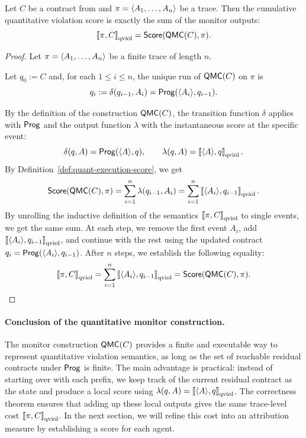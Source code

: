     

\begin{theorem}
\label{thm:correctness-qmc}
Let $C$ be a contract from \cDL and $\pi = \langle A_1, \dots, A_n \rangle $ be a trace.
Then the cumulative quantitative violation score is exactly the sum of the monitor outputs:
\[
\left\llbracket \pi, C \right\rrbracket_{\text{qviol}} =\mathsf{Score}( \mathsf{QMC}(C),\pi).
\]
\end{theorem}

\begin{proof}

Let $\pi = \langle A_1,\dots,A_{n} \rangle $ be a finite trace of length $n$.

Let $q_0 := C$ and, for each $1 \le i \le n$,  the unique run of $\mathsf{QMC}(C)$ on $\pi$ is
\[
  q_{i} := \delta(q_{i-1},A_i) = \mathsf{Prog}(\langle A_i \rangle ,q_{i-1}).
\]

By the definition of the construction $\mathsf{QMC}(C)$, the transition function $\delta$ applies with $\mathsf{Prog}$ and the output function $\lambda$  with the instantaneous score at the specific event:
\[
  \delta(q,A) = \mathsf{Prog}(\langle A \rangle ,q), \qquad \lambda(q,A) = \left\llbracket \langle A \rangle ,q \right\rrbracket_{\text{qviol}}.
\]
By Definition~\ref{def:quant-execution-score}, we get
\[
  \mathsf{Score}(\mathsf{QMC}(C),\pi) 
  = \sum_{i=1}^{n} \lambda(q_{i-1},A_i)
  = \sum_{i=1}^{n} \left\llbracket \langle A_i \rangle ,q_{i-1} \right\rrbracket_{\text{qviol}}.
\]
By unrolling the inductive definition of the semantics $\left\llbracket \pi, C \right\rrbracket_{\text{qviol}}$ to single events, we get the same sum. At each step, we remove the first event $A_i$, add $\left\llbracket \langle A_i \rangle , q_{i-1} \right\rrbracket_{\text{qviol}}$, and continue with the rest using the updated contract $q_i = \mathsf{Prog}(\langle A_i \rangle , q_{i-1})$. After $n$ steps, we establish the following equality:
\[  \left\llbracket \pi,C \right\rrbracket_{\text{qviol}} = \sum_{i=1}^{n} \left\llbracket \langle A_i \rangle ,q_{i-1} \right\rrbracket_{\text{qviol}} = \mathsf{Score}(\mathsf{QMC}(C),\pi). \qedhere \]
\end{proof}

\paragraph{Conclusion of the quantitative monitor construction.}

The monitor construction $\mathsf{QMC}(C)$ provides a finite and executable way to represent quantitative violation semantics, as long as the set of reachable residual contracts under $\mathsf{Prog}$ is finite. The main advantage is practical: instead of starting over with each prefix, we keep track of the current residual contract as the state and produce a local score using $\lambda(q,A)=\left\llbracket \langle A \rangle ,q \right\rrbracket_{\text{qviol}}$. The correctness theorem ensures that adding up these local outputs gives the same trace-level cost $\left\llbracket \pi,C \right\rrbracket_{\text{qviol}}$. In the next section, we will refine this cost into an attribution measure by establishing a score for each agent.



